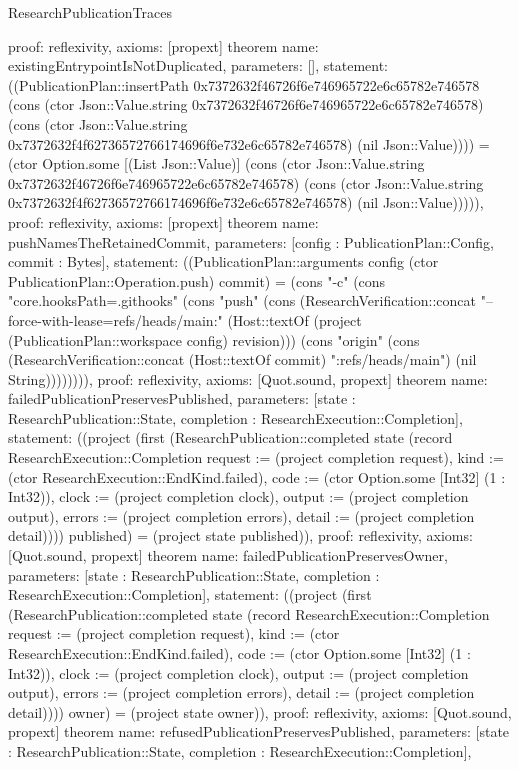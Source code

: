 \begin{lexlean}{ResearchPublicationTraces}
\begin{semanticmodule}
{ proof: reflexivity{},
 axioms: [propext]
}
theorem{
 name: existingEntrypointIsNotDuplicated,
 parameters: [],
 statement: ((PublicationPlan::insertPath 0x7372632f46726f6e746965722e6c65782e746578 (cons (ctor Json::Value.string 0x7372632f46726f6e746965722e6c65782e746578) (cons (ctor Json::Value.string 0x7372632f4f62736572766174696f6e732e6c65782e746578) (nil Json::Value)))) = (ctor Option.some [(List Json::Value)] (cons (ctor Json::Value.string 0x7372632f46726f6e746965722e6c65782e746578) (cons (ctor Json::Value.string 0x7372632f4f62736572766174696f6e732e6c65782e746578) (nil Json::Value))))),
 proof: reflexivity{},
 axioms: [propext]
}
theorem{
 name: pushNamesTheRetainedCommit,
 parameters: [config : PublicationPlan::Config, commit : Bytes],
 statement: ((PublicationPlan::arguments config (ctor PublicationPlan::Operation.push) commit) = (cons "-c" (cons "core.hooksPath=.githooks" (cons "push" (cons (ResearchVerification::concat "--force-with-lease=refs/heads/main:" (Host::textOf (project (PublicationPlan::workspace config) revision))) (cons "origin" (cons (ResearchVerification::concat (Host::textOf commit) ":refs/heads/main") (nil String)))))))),
 proof: reflexivity{},
 axioms: [Quot.sound, propext]
}
theorem{
 name: failedPublicationPreservesPublished,
 parameters: [state : ResearchPublication::State, completion : ResearchExecution::Completion],
 statement: ((project (first (ResearchPublication::completed state (record ResearchExecution::Completion {request := (project completion request), kind := (ctor ResearchExecution::EndKind.failed), code := (ctor Option.some [Int32] (1 : Int32)), clock := (project completion clock), output := (project completion output), errors := (project completion errors), detail := (project completion detail)}))) published) = (project state published)),
 proof: reflexivity{},
 axioms: [Quot.sound, propext]
}
theorem{
 name: failedPublicationPreservesOwner,
 parameters: [state : ResearchPublication::State, completion : ResearchExecution::Completion],
 statement: ((project (first (ResearchPublication::completed state (record ResearchExecution::Completion {request := (project completion request), kind := (ctor ResearchExecution::EndKind.failed), code := (ctor Option.some [Int32] (1 : Int32)), clock := (project completion clock), output := (project completion output), errors := (project completion errors), detail := (project completion detail)}))) owner) = (project state owner)),
 proof: reflexivity{},
 axioms: [Quot.sound, propext]
}
theorem{
 name: refusedPublicationPreservesPublished,
 parameters: [state : ResearchPublication::State, completion : ResearchExecution::Completion],
}
\end{semanticmodule}
\end{lexlean}
